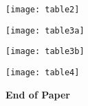 \documentclass[12pt]{article}
\begin{document}
\newpage

\vspace{0.8cm}

\centerline{\texttt{[image: table2]}}

\newpage

\vspace{3.5cm}

\centerline{\texttt{[image: table3a]}}

\newpage

\vspace{3.5cm}

\centerline{\texttt{[image: table3b]}}

\newpage

\centerline{\texttt{[image: table4]}}

\begin{center}
{\bf \large  End of Paper}
\end{center}
\end{document}

